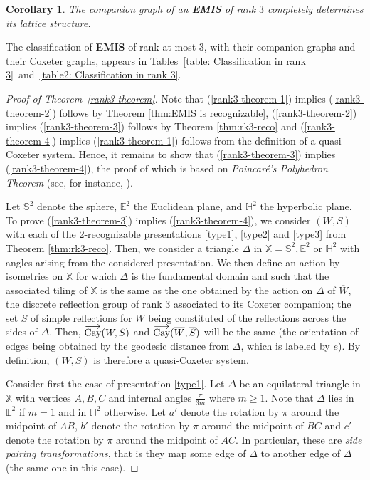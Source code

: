 \documentclass[A4paper, oneside]{amsart}
\newcommand{\id}{\textit{e}}
\newcommand{\oCay}{%
  \operatorname{%
    \overset{\smash{\raisebox{-0.45ex}{$\longrightarrow$}}}{\textnormal{Cay}}%
  }%
}
\newcommand{\Sb}{\mathbb{S}}
\newcommand{\E}{\mathbb{E}}
\newcommand{\Hb}{\mathbb{H}}
\newcommand{\X}{\mathbb{X}}
\newcommand{\EMIS}{\textnormal{\bf EMIS}\xspace}
\newcommand{\RomanNumeralCaps}[1]
{\MakeUppercase{\romannumeral #1}}
\newtheorem{cor}[thm]{Corollary}
\theoremstyle{definition}
\begin{document}
\begin{cor} \label{cor: companion rank 3}
	The companion graph of an \EMIS of rank $3$ completely determines its lattice structure.
\end{cor}

The classification of \EMIS of rank at most 3, with their companion graphs and their Coxeter graphs, appears in Tables~\ref{table: Classification in rank 3}~and~\ref{table2: Classification in rank 3}. 


\begin{proof}[Proof of Theorem~\ref{rank3-theorem}]
Note that (\ref{rank3-theorem-1}) implies (\ref{rank3-theorem-2}) follows by Theorem \ref{thm:EMIS is recognizable}, (\ref{rank3-theorem-2}) implies (\ref{rank3-theorem-3}) follows by Theorem \ref{thm:rk3-reco} and (\ref{rank3-theorem-4}) implies (\ref{rank3-theorem-1}) follows from the definition of a quasi-Coxeter system. Hence, it remains to show that (\ref{rank3-theorem-3}) implies (\ref{rank3-theorem-4}), the proof of which is based on {\em Poincaré's Polyhedron Theorem} (see, for instance, \cite[\RomanNumeralCaps{4}.H]{Kleinian}).

Let $\Sb^2$ denote the sphere, $\E^2$ the Euclidean plane, and $\Hb^2$ the hyperbolic plane. To prove (\ref{rank3-theorem-3}) implies (\ref{rank3-theorem-4}), we consider $(W,S)$ with each of the 2-recognizable presentations \ref{type1}, \ref{type2} and \ref{type3} from Theorem \ref{thm:rk3-reco}. Then, we consider a triangle $\Delta$ in $\X = \Sb^2, \E^2$ or $\Hb^2$ with angles arising from the considered presentation. We then define an action by isometries on $\X$ for which $\Delta$ is the fundamental domain and such that the associated tiling of $\X$ is the same as the one obtained by the  action on $\Delta$ of $\overline W$, the discrete reflection group of rank $3$ associated to its Coxeter companion; the set $\overline S$ of simple reflections for $\overline W$ being constituted of the reflections across the sides of $\Delta$. Then, $\oCay(W,S)$ and $\oCay(\overline W,\overline S)$ will be the same (the orientation of edges being obtained by the geodesic distance from $\Delta$, which is labeled by $\id$). By definition, $(W,S)$ is therefore a quasi-Coxeter system.

\medskip

Consider first the case of presentation \ref{type1}. Let $\Delta$ be an equilateral triangle in $\X$ with vertices $A,B,C$ and internal angles $\frac{\pi}{3m}$ where $m \geq 1$. Note that $\Delta$ lies in $\E^2$ if $m = 1$ and in $\Hb^2$ otherwise. Let $a'$ denote the rotation by $\pi$ around the midpoint of $AB$, $b'$ denote the rotation by $\pi$ around the midpoint of $BC$ and $c'$ denote the rotation by $\pi$ around the midpoint of $AC$. In particular, these are \emph{side pairing transformations}, that is they map some edge of $\Delta$ to another edge of $\Delta$ (the same one in this case). 


\end{proof}
\end{document}
